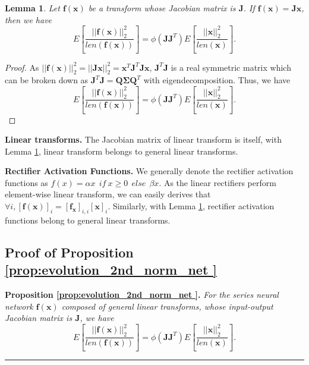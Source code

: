 \documentclass[10pt,journal,compsoc]{IEEEtran}
\newtheorem{lemma}[theorem]{Lemma}
\begin{document}
\begin{lemma}
Let $\mathbf{f}(\mathbf{x})$ be a transform whose Jacobian matrix is $\mathbf{J}$. If $\mathbf{f}(\mathbf{x})=\mathbf{Jx}$, then we have
\begin{equation}
    E\left[\frac{||\mathbf{f}(\mathbf{x})||_2^2}{len(\mathbf{f}(\mathbf{x}))}\right] = \phi(\mathbf{JJ}^T)E\left[\frac{||\mathbf{x}||_2^2}{len(\mathbf{x})}\right].
\end{equation}
\label{lemma:g_linear_trans}
\end{lemma}
\begin{proof}
As $||\mathbf{f}(\mathbf{x})||_2^2 = ||\mathbf{J} \mathbf{x}||_2^2 = \mathbf{x}^T\mathbf{J}^T\mathbf{J}\mathbf{x}$, $\mathbf{J}^T\mathbf{J}$ is a real symmetric matrix which can be broken down as $\mathbf{J}^T\mathbf{J}=\mathbf{Q\Sigma Q}^T$ with eigendecomposition. Thus, we have
\begin{equation}
    E\left[\frac{||\mathbf{f}(\mathbf{x})||_2^2}{len(\mathbf{f}(\mathbf{x}))}\right] = \phi(\mathbf{JJ}^T)E\left[\frac{||\mathbf{x}||_2^2}{len(\mathbf{x})}\right].
\end{equation}
\end{proof}

\textbf{Linear transforms.} The Jacobian matrix of linear transform is itself, with Lemma \ref{lemma:g_linear_trans}, linear transform belongs to general linear transforms.

\textbf{Rectifier Activation Functions.} We generally denote the rectifier activation functions as $f(x) = \alpha x~~if~x\ge0~~else~~\beta x$. As the linear rectifiers perform element-wise linear transform, we can easily derives that $\forall i, [\mathbf{f}(\mathbf{x})]_i = [\mathbf{f_x}]_{i, i}[\mathbf{x}]_{i}$. Similarly, with Lemma \ref{lemma:g_linear_trans}, rectifier activation functions belong to general linear transforms.
 
\subsection{Proof of Proposition \ref{prop:evolution_2nd_norm_net }}\label{proof:evolution_2nd_norm_net}

\textbf{Proposition \ref{prop:evolution_2nd_norm_net }. }\textit{
    For the series neural network $\mathbf{f}(\mathbf{x})$ composed of general linear transforms, whose input-output Jacobian matrix is $\mathbf{J}$, we have
}
\begin{equation}
    E\left[\frac{||\mathbf{f}(\mathbf{x})||_2^2}{len(\mathbf{f}(\mathbf{x}))}\right] = \phi(\mathbf{JJ}^T)E\left[\frac{||\mathbf{x}||_2^2}{len(\mathbf{x})}\right].
\end{equation}
\rule[0pt]{0.48\textwidth}{0.05em}
\end{document}

